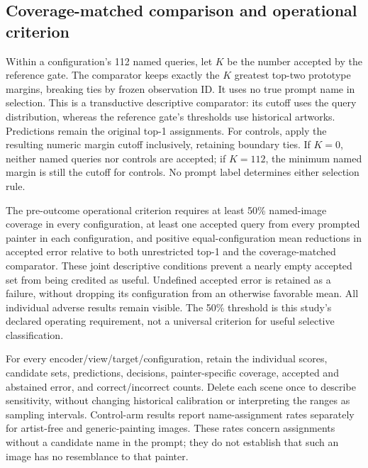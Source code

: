 \subsection{Coverage-matched comparison and operational criterion}
Within a configuration's 112 named queries, let $K$ be the number accepted by
the reference gate. The comparator keeps exactly the $K$ greatest top-two
prototype margins, breaking ties by frozen observation ID. It uses no true
prompt name in selection. This is a transductive descriptive comparator: its
cutoff uses the query distribution, whereas the reference gate's thresholds
use historical artworks. Predictions remain the original top-1 assignments.
For controls, apply the resulting numeric margin cutoff inclusively, retaining
boundary ties. If $K=0$, neither named queries nor controls are accepted; if
$K=112$, the minimum named margin is still the cutoff for controls. No prompt
label determines either selection rule.

The pre-outcome operational criterion requires at least 50\% named-image
coverage in every configuration, at least one accepted query from every
prompted painter in each configuration, and positive equal-configuration mean
reductions in accepted error relative to both unrestricted top-1 and the
coverage-matched comparator. These joint descriptive conditions prevent a
nearly empty accepted set from being credited as useful. Undefined accepted
error is retained as a failure, without dropping its configuration from an
otherwise favorable mean. All individual adverse results remain visible.
The 50\% threshold is this study's declared operating requirement, not a
universal criterion for useful selective classification.

For every encoder/view/target/configuration, retain the individual scores,
candidate sets, predictions, decisions, painter-specific coverage, accepted
and abstained error, and correct/incorrect counts. Delete each scene once to
describe sensitivity, without changing historical calibration or interpreting
the ranges as sampling intervals. Control-arm results report name-assignment
rates separately for artist-free and generic-painting images. These rates
concern assignments without a candidate name in the prompt; they do not
establish that such an image has no resemblance to that painter.
